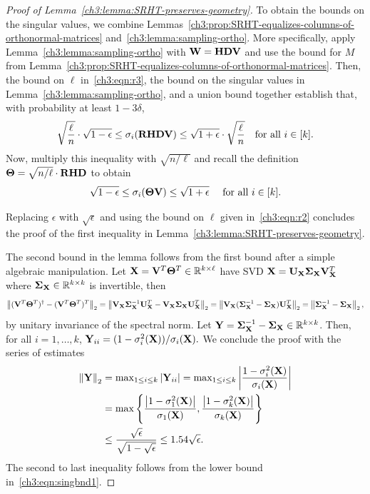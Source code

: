 \begin{proof}[Proof of Lemma~\ref{ch3:lemma:SRHT-preserves-geometry}]
To obtain the bounds on the singular values, we combine 
Lemmas~\ref{ch3:prop:SRHT-equalizes-columns-of-orthonormal-matrices} 
and~\ref{ch3:lemma:sampling-ortho}. More specifically, apply 
Lemma~\ref{ch3:lemma:sampling-ortho} with $\mathbf{W} = \mathbf{H} \mathbf{D} \mathbf{V}$ and use
the bound for $M$ from 
Lemma~\ref{ch3:prop:SRHT-equalizes-columns-of-orthonormal-matrices}. Then, 
the bound on $\ell$ in~\eqref{ch3:eqn:r3}, the bound on the singular values
in Lemma~\ref{ch3:lemma:sampling-ortho}, and a union bound together establish that,
with probability at least $1 - 3\delta$,
\[ 
   \sqrt{\frac{\ell}{n}} \cdot \sqrt{1-\epsilon} \le 
   \sigma_i( \mathbf{R} \mathbf{H} \mathbf{D} \mathbf{V}) \le  
   \sqrt{1+\epsilon} \cdot \sqrt{\frac{\ell}{n}} 
   \quad \text{for all $i \in [k].$}
\]
Now, multiply this inequality with $\sqrt{n/\ell}$ and recall the definition 
$\mathbf{\Theta} = \sqrt{n/\ell} \cdot \mathbf{R} \mathbf{H}  \mathbf{D}$ to obtain
\begin{equation}
\label{ch3:eqn:singbnd1}
\sqrt{1-\epsilon} \le \sigma_i( \mathbf{\Theta} \mathbf{V}) \le  \sqrt{1+\epsilon}
 \quad \text{ for all $i \in [k].$} 
\end{equation}

Replacing $\epsilon$ with $\sqrt{\epsilon}$ and using 
the bound on $\ell$ given in~\eqref{ch3:eqn:r2} concludes the proof of the
first inequality in Lemma~\ref{ch3:lemma:SRHT-preserves-geometry}.

The second bound in the lemma follows from the first bound after a simple 
algebraic manipulation.
Let $\mathbf{X} = \mathbf{V}^T \mathbf{\Theta}^T \in \mathbb{R}^{k \times \ell}$ have SVD 
$\mathbf{X} = \mathbf{U}_{\mathbf{X}} \mathbf{\Sigma}_{\mathbf{X}} \mathbf{V}_{\mathbf{X}}^T $ where  
$\mathbf{\Sigma}_{\mathbf{X}} \in \mathbb{R}^{k \times k}$ is invertible, then
%
\[ \left\|(\mathbf{V}^T \mathbf{\Theta}^T)^\dagger - 
    (\mathbf{V}^T \mathbf{\Theta}^T)^T\right\|_2 =
    \left\|\mathbf{V}_{\mathbf{X}} \mathbf{\Sigma}_{\mathbf{X}}^{-1} \mathbf{U}_{\mathbf{X}}^T - 
    \mathbf{V}_{\mathbf{X}} \mathbf{\Sigma}_{\mathbf{X}} \mathbf{U}_{\mathbf{X}}^T  \right\|_2 =
    \left\|\mathbf{V}_{\mathbf{X}}(\mathbf{\Sigma}_{\mathbf{X}}^{-1} - \mathbf{\Sigma}_{\mathbf{X}}) 
    \mathbf{U}_{\mathbf{X}}^T\right\|_2 = \left\|\mathbf{\Sigma}_{\mathbf{X}}^{-1} - \mathbf{\Sigma}_{\mathbf{X}}\right\|_2,\]
%
by unitary invariance of the spectral norm. Let $\mathbf{Y} = \mathbf{\Sigma}_{\mathbf{X}}^{-1} - 
\mathbf{\Sigma}_{\mathbf{X}} \in \mathbb{R}^{k \times k}$. Then, for all $i=1,\ldots ,k$, 
$\mathbf{Y}_{ii}  = (1 - \sigma_i^2(\mathbf{X}))/\sigma_{i}(\mathbf{X}).$ 
We conclude the proof with the series of estimates
\begin{align*}
\left\| \mathbf{Y} \right\|_2 & =
\max\nolimits_{1 \leq i \leq k} \left|\mathbf{Y}_{ii} \right| =
\max\nolimits_{1 \leq i \leq k} 
 \left|\frac{ 1 - \sigma_i^2(\mathbf{X})}{ \sigma_{i}(\mathbf{X}) } \right| \\
 & =
\max\left\{ \frac{ \left|1 - \sigma_1^2(\mathbf{X})\right| }{ \sigma_{1}(\mathbf{X}) },
           \frac{ \left|1 - \sigma_k^2(\mathbf{X})\right| }{ \sigma_{k}(\mathbf{X}) } \right\} \\
 & \le \frac{ \sqrt{\epsilon} }{\sqrt{1-\sqrt{\epsilon}}} \le 
 1.54 \sqrt{\epsilon}.
\end{align*}
The second to last inequality follows from the lower bound in~\eqref{ch3:eqn:singbnd1}.
\end{proof}

